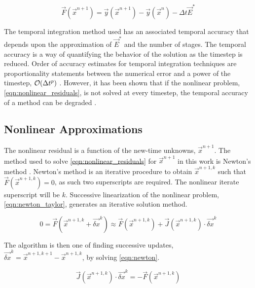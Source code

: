 \begin{equation}
\label{eqn:nonlinear_residuals}
\vec{F}(\vec{x}^{n+1}) = \vec{y}(\vec{x}^{n+1}) - \vec{y}(\vec{x}^n) -\Delta t \vec{E}^{*}
\end{equation}

The temporal integration method used has an associated temporal accuracy that depends upon the approximation of $\vec{E}^{*}$ and the number of stages. 
The temporal accuracy is a way of quantifying the behavior of the solution as the timestep is reduced.
Order of accuracy estimates for temporal integration techniques are proportionality statements between the numerical error and a power of the timestep, $\mathcal{O}(\dt{}^{p})$ \cite{LeVeque2007}. 
However, it has been shown that if the nonlinear problem, \eqref{eqn:nonlinear_residuals}, is not solved at every timestep, the temporal accuracy of a method can be degraded \cite{Knoll2001, Mahaffy1993}.

\subsection{Nonlinear Approximations}
\label{subsect:nonlinear_approximations}

The nonlinear residual is a function of the new-time unknowns, $\vec{x}^{n+1}$.
The method used to solve \eqref{eqn:nonlinear_residuals} for $\vec{x}^{n+1}$ in this work is Newton's method \cite{Deuflhard2004, Dennis1996}.
Newton's method is an iterative procedure to obtain $\vec{x}^{n+1,k}$ such that $\vec{F}(\vec{x}^{n+1,k}) = 0$, as such two superscripts are required.
The nonlinear iterate superscript will be $k$.
Successive linearization of the nonlinear problem, \eqref{eqn:newton_taylor}, generates an iterative solution method.

\begin{equation}
\label{eqn:newton_taylor}
0 = \vec{F}(\vec{x}^{n+1,k}+\vec{\delta x}^k) \approx \vec{F}(\vec{x}^{n+1,k}) + \vec{J}(\vec{x}^{n+1,k}) \cdot \vec{\delta x}^k
\end{equation}

The algorithm is then one of finding successive updates, $\vec{\delta x}^k = \vec{x}^{n+1,k+1} - \vec{x}^{n+1,k}$, by solving \eqref{eqn:newton}.

\begin{equation}
\label{eqn:newton}
\vec{J}(\vec{x}^{n+1,k})\cdot \vec{\delta x}^k = -\vec{F}(\vec{x}^{n+1,k})
\end{equation} 

